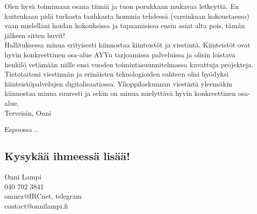 \documentclass[a4paper, 12pt, finnish]{report}
\newcommand*{\findate}{\the\day.\the\month.\the\year}
\begin{document}
Olen hyvä toimimaan osana tiimiä ja tuon porukkaan mukavaa letkeyttä.
En kuitenkaan pidä turhasta tauhkasta hommia tehdessä (varsinkaan kokoustaessa) vaan mielelläni hoidan kokouksissa ja tapaamisissa ensin asiat alta pois, tämän jälkeen sitten huvit!\\

\newpage
Hallituksessa minua erityisesti kiinnostaa kiinteistöt ja viestintä.
Kiinteistöt ovat hyvin konkreettinen osa-alue AYYn tarjoamissa palveluissa ja olisin loistava henkilö vetämään niille ensi vuoden toimintasuunnitelmassa kuvattuja projekteja.
Tietotaitoni viestinnän ja erinäisten teknologioiden suhteen olisi hyödyksi kiinteistöpalvelujen digitalisaatiossa.
Ylioppilaskunnan viestintä yleensäkin kiinnostaa minua suuresti ja sekin on minua mielyttävä hyvin konkreettinen osa-alue.\\

Terveisin, Onni

Espoossa \findate

\subsection*{Kysykää ihmeessä lisää!}
Onni Lampi\\
040 702 3841\\
omnez@IRCnet, telegram\\
contact@onnilampi.fi
\end{document}
